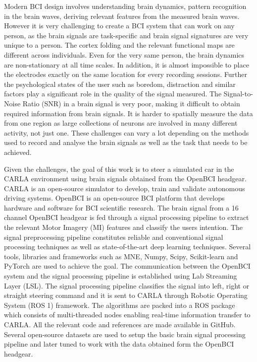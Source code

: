 Modern BCI design involves understanding brain dynamics, pattern recognition in the brain waves, deriving relevant features from the measured brain waves. However it is very challenging to create a BCI system that can work on any person, as the brain signals are task-specific and brain signal signatures are very unique to a person. The cortex folding and the relevant functional maps are different across individuals. Even for the very same person, the brain dynamics are non-stationary at all time scales. In addition, it is almost impossible to place the electrodes exactly on the same location for every recording sessions. Further the psychological states of the user such as boredom, distraction and similar factors play a significant role in the quality of the signal measured. The Signal-to-Noise Ratio (SNR)  in a brain signal is very poor, making it difficult to obtain required information from brain signals. It is harder to spatially measure the data from one region as large collections of neurons are involved in many different activity, not just one. These challenges can vary a lot depending on the methods used to record and analyse the brain signals as well as the task that needs to be achieved. 

Given the challenges, the goal of this work is to steer a simulated car in the CARLA environment using brain signals obtained from the OpenBCI headgear. CARLA is an open-source simulator to develop, train and validate autonomous driving systems. OpenBCI is an open-source BCI platform that develops hardware and software for BCI scientific research. The brain signal from a 16 channel OpenBCI headgear is fed through a signal processing pipeline to extract the relevant Motor Imagery (MI) features and classify the users intention. The signal preprocessing pipeline constitutes reliable and conventional signal processing techniques as well as state-of-the-art deep learning techniques. Several tools, libraries and frameworks such as MNE, Numpy, Scipy, Scikit-learn and PyTorch are used to achieve the goal. The communication between the OpenBCI system and the signal processing pipeline is established using Lab Streaming Layer (LSL). The signal processing pipeline classifies the signal into left, right or straight steering command and it is sent to CARLA through Robotic Operating System (ROS 1) framework. The algorithms are packed into a ROS package which consists of multi-threaded nodes enabling real-time information transfer to CARLA. All the relevant code and references are made available in GitHub\cite{BCI_MotionControl}. Several open-source datasets are used to setup the basic brain signal processing pipeline and later tuned to work with the data obtained form the OpenBCI headgear.

